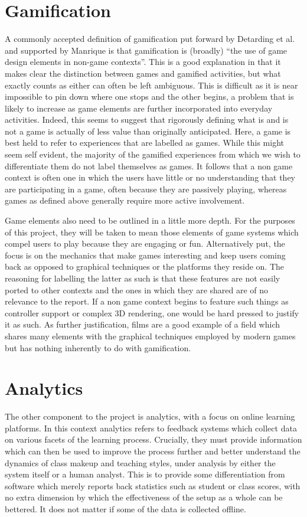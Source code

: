 \documentclass[12pt,a4paper,twoside]{report}
\begin{document}
\section{Gamification}
A commonly accepted definition of gamification put forward by Detarding et al. \cite{deterding2011game} and supported by Manrique \cite{iversitymooc} is that gamification is (broadly) ``the use of game design elements in non-game contexts''. This is a good explanation in that it makes clear the distinction between games and gamified activities, but what exactly counts as either can often be left ambiguous. This is difficult as it is near impossible to pin down where one stops and the other begins, a problem that is likely to increase as game elements are further incorporated into everyday activities. Indeed, this seems to suggest that rigorously defining what is and is not a game is actually of less value than originally anticipated. Here, a game is best held to refer to experiences that are labelled as games. While this might seem self evident, the majority of the gamified experiences from which we wish to differentiate them do not label themselves as games. It follows that a non game context is often one in which the users have little or no understanding that they are participating in a game, often because they are passively playing, whereas games as defined above generally require more active involvement.

Game elements also need to be outlined in a little more depth. For the purposes of this project, they will be taken to mean those elements of game systems which compel users to play because they are engaging or fun. Alternatively put, the focus is on the mechanics that make games interesting and keep users coming back as opposed to graphical techniques or the platforms they reside on. The reasoning for labelling the latter as such is that these features are not easily ported to other contexts and the ones in which they are shared are of no relevance to the report. If a non game context begins to feature such things as controller support or complex 3D rendering, one would be hard pressed to justify it as such. As further justification, films are a good example of a field which shares many elements with the graphical techniques employed by modern games but has nothing inherently to do with gamification.

\section{Analytics}
The other component to the project is analytics, with a focus on online learning platforms. In this context analytics refers to feedback systems which collect data on various facets of the learning process. Crucially, they must provide information which can then be used to improve the process further and better understand the dynamics of class makeup and teaching styles, under analysis by either the system itself or a human analyst. This is to provide some differentiation from software which merely reports back statistics such as student or class scores, with no extra dimension by which the effectiveness of the setup as a whole can be bettered. It does not matter if some of the data is collected offline.
\end{document}
